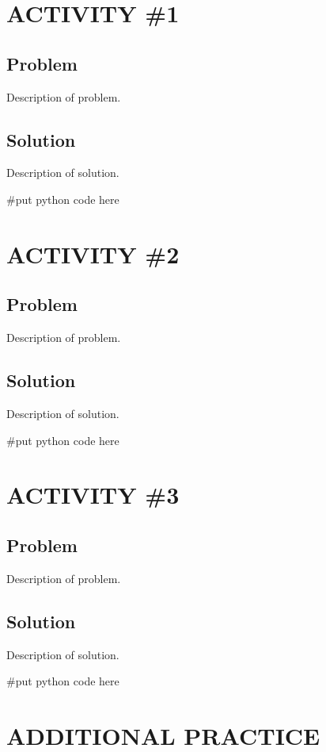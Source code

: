 \documentclass[14pt]{extreport}%
\begin{document}
\section*{ACTIVITY \#1} 
\subsection*{Problem}
Description of problem.
\subsection*{Solution}
Description of solution.\\
\begin{python}
#put python code here
\end{python}

\section*{ACTIVITY \#2} 
\subsection*{Problem}
Description of problem.

\subsection*{Solution}
Description of solution.\\
\begin{python}
#put python code here
\end{python}

\section*{ACTIVITY \#3} 
\subsection*{Problem}
Description of problem.
\subsection*{Solution}
Description of solution. \\
\begin{python}
#put python code here
\end{python}

\section*{ADDITIONAL PRACTICE} 
\end{document}
